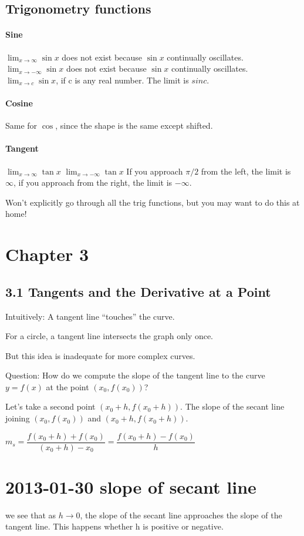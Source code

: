 \documentclass[12pt]{article}
\begin{document}
\subsection{Trigonometry functions}
\paragraph{Sine}
$\lim_{x\to\infty}\sin x$ does not exist because $\sin x$ continually oscillates.
$\lim_{x\to-\infty}\sin x$ does not exist because $\sin x$ continually oscillates.
$\lim_{x\to c}\sin x$, if c is any real number. The limit is $sin c$.
\paragraph{Cosine}
Same for $\cos$, since the shape is the same except shifted.
\paragraph{Tangent}
$\lim_{x\to\infty}\tan x$
$\lim_{x\to-\infty}\tan x$
If you approach $\pi/2$ from the left, the limit is $\infty$, if you approach from the right, the limit is
$-\infty$. 


Won't explicitly go through all the trig functions, but you may want to do this at home!
\section{Chapter 3}
\subsection{3.1 Tangents and the Derivative at a Point}

Intuitively: A tangent line ``touches'' the curve.

For a circle, a tangent line intersects the graph only once.

But this idea is inadequate for more complex curves.

Question: How do we compute the slope of the tangent line to the curve $y=f(x)$ at the point $(x_0,f(x_0))$?


Let's take a second point $(x_0+h,f(x_0+h))$. The slope of the secant line joining $(x_0,f(x_0))$ and
$(x_0+h,f(x_0+h))$.

$m_s = \dfrac{f(x_0+h)+f(x_0)}{(x_0+h)-x_0} = \dfrac{f(x_0+h)-f(x_0)}{h}$

\section{2013-01-30 slope of secant line}
we see that as $h \to 0$, the slope of the secant line approaches the slope of the tangent line.
This happens whether h is positive or negative.
\end{document}

